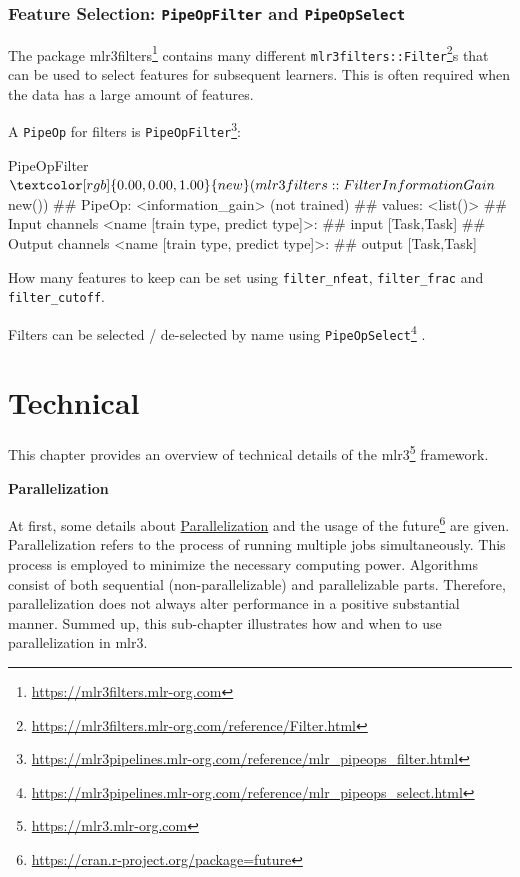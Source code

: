 \documentclass[12pt,]{scrbook}
\newenvironment{Shaded}{}{}
\newcommand{\KeywordTok}[1]{\textcolor[rgb]{0.00,0.00,1.00}{#1}}
\newcommand{\NormalTok}[1]{#1}
\newcommand{\OperatorTok}[1]{#1}
\renewcommand{\href}[2]{#2\footnote{\url{#1}}}
\begin{document}
\hypertarget{feature-selection-pipeopfilter-and-pipeopselect}{%
\subsection{\texorpdfstring{Feature Selection: \texttt{PipeOpFilter} and \texttt{PipeOpSelect}}{Feature Selection: PipeOpFilter and PipeOpSelect}}\label{feature-selection-pipeopfilter-and-pipeopselect}}

The package \href{https://mlr3filters.mlr-org.com}{mlr3filters} contains many different \href{https://mlr3filters.mlr-org.com/reference/Filter.html}{\texttt{mlr3filters::Filter}}s that can be used to select features for subsequent learners.
This is often required when the data has a large amount of features.

A \texttt{PipeOp} for filters is \href{https://mlr3pipelines.mlr-org.com/reference/mlr_pipeops_filter.html}{\texttt{PipeOpFilter}}:

\begin{Shaded}
\begin{Highlighting}[]
\NormalTok{PipeOpFilter}\OperatorTok{$}\KeywordTok{new}\NormalTok{(mlr3filters}\OperatorTok{::}\NormalTok{FilterInformationGain}\OperatorTok{$}\KeywordTok{new}\NormalTok{())}
\NormalTok{## PipeOp: <information_gain> (not trained)}
\NormalTok{## values: <list()>}
\NormalTok{## Input channels <name [train type, predict type]>:}
\NormalTok{##   input [Task,Task]}
\NormalTok{## Output channels <name [train type, predict type]>:}
\NormalTok{##   output [Task,Task]}
\end{Highlighting}
\end{Shaded}

How many features to keep can be set using \texttt{filter\_nfeat}, \texttt{filter\_frac} and \texttt{filter\_cutoff}.

Filters can be selected / de-selected by name using \href{https://mlr3pipelines.mlr-org.com/reference/mlr_pipeops_select.html}{\texttt{PipeOpSelect}} .

\hypertarget{technical}{%
\chapter{Technical}\label{technical}}

This chapter provides an overview of technical details of the \href{https://mlr3.mlr-org.com}{mlr3} framework.

\textbf{Parallelization}

At first, some details about \protect\hyperlink{parallelization}{Parallelization} and the usage of the \href{https://cran.r-project.org/package=future}{future} are given.
Parallelization refers to the process of running multiple jobs simultaneously.
This process is employed to minimize the necessary computing power.
Algorithms consist of both sequential (non-parallelizable) and parallelizable parts.
Therefore, parallelization does not always alter performance in a positive substantial manner.
Summed up, this sub-chapter illustrates how and when to use parallelization in mlr3.
\end{document}
